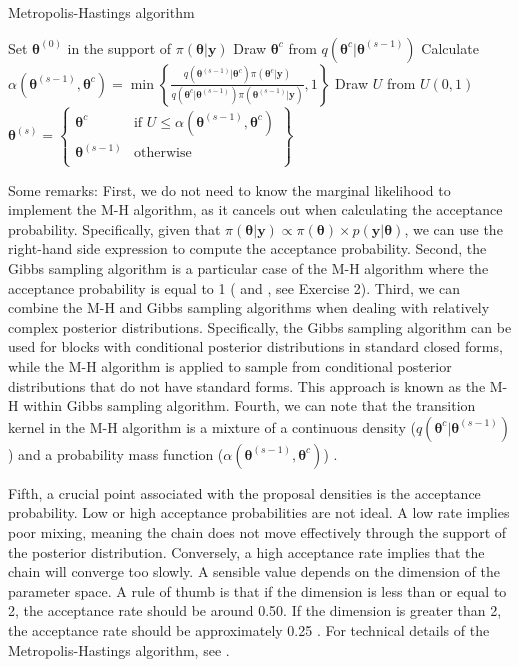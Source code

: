 \begin{algorithm}[h!]
	\caption{Metropolis-Hastings algorithm}\label{Alg:MH}
	\begin{algorithmic}[1]
		\State Set $\bm{\theta}^{(0)}$ in the support of $\pi(\bm{\theta}|\bm{y})$  		 			
		\State Draw $\bm{\theta}^{c}$ from $q(\bm{\theta}^{c}|\bm{\theta}^{(s-1)})$
		\State Calculate $\alpha(\bm{\theta}^{(s-1)}, \bm{\theta}^{c}) = 
		\min\left\{\frac{q(\bm{\theta}^{(s-1)} | \bm{\theta}^{c}) \pi(\bm{\theta}^{c} | \bm{y})}{q(\bm{\theta}^{c} | \bm{\theta}^{(s-1)}) \pi(\bm{\theta}^{(s-1)} | \bm{y})}, 1\right\}$
		\State Draw $U$ from $U(0,1)$
		\State $\bm{\theta}^{(s)}=\begin{Bmatrix}
			\bm{\theta}^{c} & \text{if } U\leq \alpha(\bm{\theta}^{(s-1)}, \bm{\theta}^{c})\\
			\bm{\theta}^{(s-1)} & \text{otherwise}\\
		\end{Bmatrix}$
		\EndFor 
	\end{algorithmic} 
\end{algorithm}

Some remarks: First, we do not need to know the marginal likelihood to implement the M-H algorithm, as it cancels out when calculating the acceptance probability. Specifically, given that $\pi(\bm{\theta}|\bm{y}) \propto \pi(\bm{\theta}) \times p(\bm{y}|\bm{\theta})$, we can use the right-hand side expression to compute the acceptance probability. Second, the Gibbs sampling algorithm is a particular case of the M-H algorithm where the acceptance probability is equal to 1 (\cite{Gelman1992} and \cite[Chap.~10]{robert2011monte}, see Exercise 2). Third, we can combine the M-H and Gibbs sampling algorithms when dealing with relatively complex posterior distributions. Specifically, the Gibbs sampling algorithm can be used for blocks with conditional posterior distributions in standard closed forms, while the M-H algorithm is applied to sample from conditional posterior distributions that do not have standard forms. This approach is known as the M-H within Gibbs sampling algorithm. Fourth, we can note that the transition kernel in the M-H algorithm is a mixture of a continuous density ($q(\bm{\theta}^{c} | \bm{\theta}^{(s-1)})$) and a probability mass function ($\alpha(\bm{\theta}^{(s-1)}, \bm{\theta}^{c})$) \cite{chib1995understanding}. 

Fifth, a crucial point associated with the proposal densities is the acceptance probability. Low or high acceptance probabilities are not ideal. A low rate implies poor mixing, meaning the chain does not move effectively through the support of the posterior distribution. Conversely, a high acceptance rate implies that the chain will converge too slowly. A sensible value depends on the dimension of the parameter space. A rule of thumb is that if the dimension is less than or equal to 2, the acceptance rate should be around 0.50. If the dimension is greater than 2, the acceptance rate should be approximately 0.25 \cite{Roberts1997}. For technical details of the Metropolis-Hastings algorithm, see \cite[Chap.~7]{robert2011monte}.


